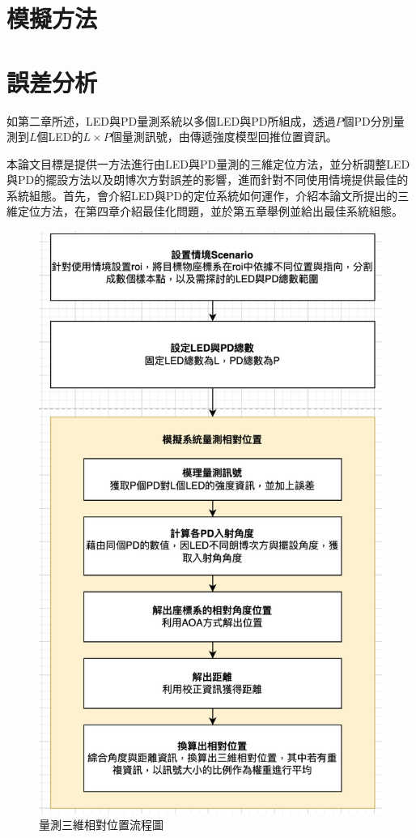 \section{模擬方法}
\section{誤差分析}



如第二章所述，LED與PD量測系統以多個LED與PD所組成，透過$P$個PD分別量測到$L$個LED的$L\times P$個量測訊號，由傳遞強度模型回推位置資訊。

本論文目標是提供一方法進行由LED與PD量測的三維定位方法，並分析調整LED與PD的擺設方法以及朗博次方對誤差的影響，進而針對不同使用情境提供最佳的系統組態。首先，會介紹LED與PD的定位系統如何運作，介紹本論文所提出的三維定位方法，在第四章介紹最佳化問題，並於第五章舉例並給出最佳系統組態。

\begin{figure}[ht]
    \centering
    \includegraphics[width=12cm]{ch3pic/flowchart_pos.png}
    \caption{量測三維相對位置流程圖}
    \label{flow:pos}
\end{figure}



